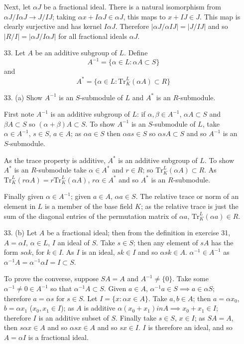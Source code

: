 \documentclass{article}
\begin{document}
\begin{enumerate}
Next, let $\alpha J$ be a fractional ideal.  There is a natural isomorphism from $\alpha J / I \alpha J \to J / IJ$; taking $\alpha x + I\alpha J \in \alpha J$, this maps to $x + IJ \in J$.  This map is clearly surjective and has kernel $I \alpha J$.  Therefore $|\alpha J / \alpha I J| = |J / IJ|$ and so $|R/I| = |\alpha J / I\alpha J|$ for all fractional ideals $\alpha J$.

\item[33.] Let $A$ be an additive subgroup of $L$.  Define \[ A^{-1} = \{\alpha \in L : \alpha A \subset S \} \] and \[ A^{*} = \{ \alpha \in L : \text{Tr}^{L}_{K}(\alpha A) \subset R \} \]

\item[33. (a)] Show $A^{-1}$ is an $S$-submodule of $L$ and $A^{*}$ is an $R$-submodule.

First note $A^{-1}$ is an additive subgroup of $L$: if $\alpha, \beta \in A^{-1}$, $\alpha A \subset S$ and $\beta A \subset S$ so $(\alpha + \beta) A \subset S$.  To show $A^{-1}$ is an $S$-submodule of $L$, take $\alpha \in A^{-1}$, $s \in S$, $a \in A$; as $\alpha a \in S$ then $\alpha a s \in S$ so $\alpha s A \subset S$ and so $A^{-1}$ is an $S$-submodule.

As the trace property is additive, $A^{*}$ is an additive subgroup of $L$.  To show $A^{*}$ is an $R$-submodule take $\alpha \in A^{*}$ and $r \in R$; so $\text{Tr}^{L}_{K}(\alpha A) \subset R$.  As $\text{Tr}^{L}_{K}(r \alpha A) = r \text{Tr}^{L}_{K}(\alpha A)$, $r\alpha \in A^{*}$ and so $A^{*}$ is an $R$-submodule.

Finally given $\alpha \in A^{-1}$; given $a \in A$, $\alpha a \in S$.  The relative trace or norm of an element in $L$ is a member of the base field $K$; as the relative trace is just the sum of the diagonal entries of the permutation matrix of $\alpha a$, $\text{Tr}^{L}_{K}(\alpha a) \in R$.

\item[33. (b)] Let $A$ be a fractional ideal; then from the definition in exercise 31, $A = \alpha I$, $\alpha \in L$, $I$ an ideal of $S$.  Take $s \in S$; then any element of $sA$ has the form $s\alpha k$, for $k \in I$.  As $I$ is an ideal, $sk \in I$ and so $\alpha s k \in A$.  $\alpha^{-1} \in A^{-1}$ as $\alpha^{-1} A = \alpha^{-1} \alpha I = I \subset S$.

To prove the converse, suppose $SA = A$ and $A^{-1} \neq \{ 0 \}$.  Take some $\alpha^{-1} \neq 0 \in A^{-1}$ so that $\alpha^{-1} A \subset S$.  Given $a \in A$, $\alpha^{-1} a \in S \implies a \in \alpha S$; therefore $a = \alpha s$ for $s \in S$.  Let $I = \{ x : \alpha x \in A \}$.  Take $a, b \in A$; then $a = \alpha x_0$, $b = \alpha x_1$ ($x_0, x_1 \in I$); as $A$ is additive $\alpha (x_0 + x_1) in A \implies x_0 + x_1 \in I$; therefore $I$ is an additive subset of $S$.  Finally take $s \in S$, $x \in I$; as $SA = A$, then $s\alpha x \in A$ and so $\alpha sx \in A$ and so $sx \in I$.  $I$ is therefore an ideal, and so $A = \alpha I$ is a fractional ideal.


\end{enumerate}
\end{document}
